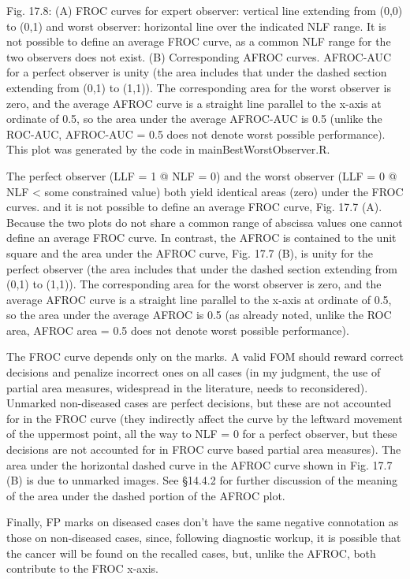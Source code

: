 \documentclass[
]{book}
\begin{document}
Fig. 17.8: (A) FROC curves for expert observer: vertical line extending from (0,0) to (0,1) and worst observer: horizontal line over the indicated NLF range. It is not possible to define an average FROC curve, as a common NLF range for the two observers does not exist. (B) Corresponding AFROC curves. AFROC-AUC for a perfect observer is unity (the area includes that under the dashed section extending from (0,1) to (1,1)). The corresponding area for the worst observer is zero, and the average AFROC curve is a straight line parallel to the x-axis at ordinate of 0.5, so the area under the average AFROC-AUC is 0.5 (unlike the ROC-AUC, AFROC-AUC = 0.5 does not denote worst possible performance). This plot was generated by the code in mainBestWorstObserver.R.

The perfect observer (LLF = 1 @ NLF = 0) and the worst observer (LLF = 0 @ NLF \textless{} some constrained value) both yield identical areas (zero) under the FROC curves. and it is not possible to define an average FROC curve, Fig. 17.7 (A). Because the two plots do not share a common range of abscissa values one cannot define an average FROC curve. In contrast, the AFROC is contained to the unit square and the area under the AFROC curve, Fig. 17.7 (B), is unity for the perfect observer (the area includes that under the dashed section extending from (0,1) to (1,1)). The corresponding area for the worst observer is zero, and the average AFROC curve is a straight line parallel to the x-axis at ordinate of 0.5, so the area under the average AFROC is 0.5 (as already noted, unlike the ROC area, AFROC area = 0.5 does not denote worst possible performance).

The FROC curve depends only on the marks. A valid FOM should reward correct decisions and penalize incorrect ones on all cases (in my judgment, the use of partial area measures, widespread in the literature, needs to reconsidered). Unmarked non-diseased cases are perfect decisions, but these are not accounted for in the FROC curve (they indirectly affect the curve by the leftward movement of the uppermost point, all the way to NLF = 0 for a perfect observer, but these decisions are not accounted for in FROC curve based partial area measures). The area under the horizontal dashed curve in the AFROC curve shown in Fig. 17.7 (B) is due to unmarked images. See §14.4.2 for further discussion of the meaning of the area under the dashed portion of the AFROC plot.

Finally, FP marks on diseased cases don't have the same negative connotation as those on non-diseased cases, since, following diagnostic workup, it is possible that the cancer will be found on the recalled cases, but, unlike the AFROC, both contribute to the FROC x-axis.
\end{document}

